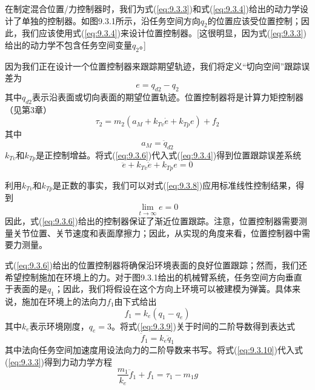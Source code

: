 \documentclass[12pt,a4paper]{ctexart}
\begin{document}
在制定混合位置/力控制器时，我们为式(\ref{eq:9.3.3})和式(\ref{eq:9.3.4})给出的动力学设计了单独的控制器。如图9.3.1所示，沿任务空间方向$q_2$的位置应该受位置控制；因此，我们应该使用式(\ref{eq:9.3.4})来设计位置控制器。[这很明显，因为式(\ref{eq:9.3.3})给出的动力学不包含任务空间变量$q_2$。]

因为我们正在设计一个位置控制器来跟踪期望轨迹，我们将定义``切向空间''跟踪误差为
\begin{equation}\label{eq:9.3.5}
e = q_{d2} - q_2
\end{equation}
其中$q_{d2}$表示沿表面或切向表面的期望位置轨迹。位置控制器将是计算力矩控制器（见第3章）
\begin{equation}\label{eq:9.3.6}
\tau_2 = m_2(a_M + k_{Tv}\dot{e} + k_{Tp}e) + f_2
\end{equation}
其中
\begin{equation}\label{eq:9.3.7}
a_M = \ddot{q}_{d2}
\end{equation}
$k_{Tv}$和$k_{Tp}$是正控制增益。将式(\ref{eq:9.3.6})代入式(\ref{eq:9.3.4})得到位置跟踪误差系统
\begin{equation}\label{eq:9.3.8}
\ddot{e} + k_{Tv}\dot{e} + k_{Tp}e = 0
\end{equation}

利用$k_{Tv}$和$k_{Tp}$是正数的事实，我们可以对式(\ref{eq:9.3.8})应用标准线性控制结果，得到
\[
\lim_{t \to \infty} e = 0
\]
因此，式(\ref{eq:9.3.6})给出的控制器保证了渐近位置跟踪。注意，位置控制器需要测量关节位置、关节速度和表面摩擦力；因此，从实现的角度来看，位置控制器中需要力测量。

式(\ref{eq:9.3.6})给出的位置控制器将确保沿环境表面的良好位置跟踪；然而，我们还希望控制施加在环境上的力。对于图9.3.1给出的机械臂系统，任务空间方向垂直于表面的是$q_1$；因此，我们将假设在这个方向上环境可以被建模为弹簧。具体来说，施加在环境上的法向力$f_1$由下式给出
\begin{equation}\label{eq:9.3.9}
f_1 = k_e(q_1 - q_e)
\end{equation}
其中$k_e$表示环境刚度，$q_e = 3$。将式(\ref{eq:9.3.9})关于时间的二阶导数得到表达式
\begin{equation}\label{eq:9.3.10}
\ddot{f}_1 = k_e\ddot{q}_1
\end{equation}
其中法向任务空间加速度用设法向力的二阶导数来书写。将式(\ref{eq:9.3.10})代入式(\ref{eq:9.3.3})得到力动力学方程
\begin{equation}\label{eq:9.3.11}
\frac{m_1}{k_e}\ddot{f}_1 + f_1 = \tau_1 - m_1g
\end{equation}
\end{document}

